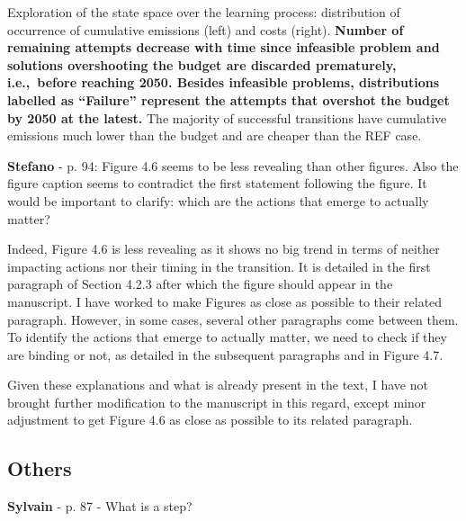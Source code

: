 \documentclass[12pt,a4paper]{article}
\def\ie{i.e.,\ }
\begin{document}
\begin{mdframed}[style=manuscript] %
Exploration of the state space over the learning process: distribution of occurrence of cumulative emissions (left) and costs (right). \textbf{Number of remaining attempts decrease with time since infeasible problem and solutions overshooting the  budget are discarded prematurely, \ie before reaching 2050. Besides infeasible problems, distributions labelled as ``Failure'' represent the attempts that overshot the  budget by 2050 at the latest.} The majority of successful transitions have cumulative emissions much lower than the  budget and are cheaper than the REF case. 
\end{mdframed}

\begin{mdframed}[style=comment] %
{\color{orange} \textbf{Stefano}} - p. 94: Figure 4.6 seems to be less revealing than other figures. Also the figure caption seems to contradict the first statement following the figure. It would be important to clarify: which are the actions that emerge to actually matter?
\end{mdframed}

\noindent Indeed, Figure 4.6 is less revealing as it shows no big trend in terms of neither impacting actions nor their timing in the transition.  It is detailed in the first paragraph of Section 4.2.3 after which the figure should appear in the manuscript. I have worked to make Figures as close as possible to their related paragraph. However, in some cases, several other paragraphs come between them. To identify the actions that emerge to actually matter, we need to check if they are binding or not, as detailed in the subsequent paragraphs and in Figure 4.7.

Given these explanations and what is already present in the text, I have not brought further modification to the manuscript in this regard, except minor adjustment to get Figure 4.6 as close as possible to its related paragraph.


\subsection{Others}


\begin{mdframed}[style=comment] %
{\color{purple} \textbf{Sylvain}} - p. 87 - What is a step?
\end{mdframed}
\end{document}
